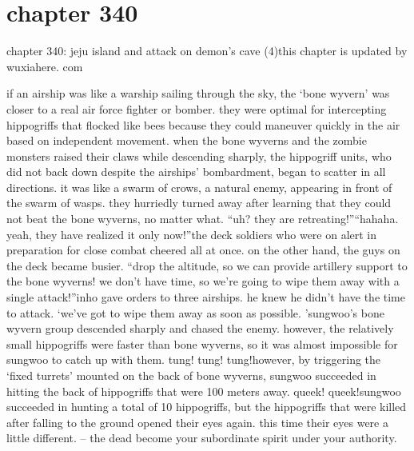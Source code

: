 \section{chapter 340}

chapter 340: jeju island and attack on demon’s cave (4)this chapter is updated by wuxiahere.
com




if an airship was like a warship sailing through the sky, the ‘bone wyvern’ was closer to a real air force fighter or bomber.
 they were optimal for intercepting hippogriffs that flocked like bees because they could maneuver quickly in the air based on independent movement.
when the bone wyverns and the zombie monsters raised their claws while descending sharply, the hippogriff units, who did not back down despite the airships’ bombardment, began to scatter in all directions.
 it was like a swarm of crows, a natural enemy, appearing in front of the swarm of wasps.
 they hurriedly turned away after learning that they could not beat the bone wyverns, no matter what.
“uh? they are retreating!”“hahaha.
 yeah, they have realized it only now!”the deck soldiers who were on alert in preparation for close combat cheered all at once.
on the other hand, the guys on the deck became busier.
“drop the altitude, so we can provide artillery support to the bone wyverns! we don’t have time, so we’re going to wipe them away with a single attack!”inho gave orders to three airships.
 he knew he didn’t have the time to attack.
‘we’ve got to wipe them away as soon as possible.
’sungwoo’s bone wyvern group descended sharply and chased the enemy.
however, the relatively small hippogriffs were faster than bone wyverns, so it was almost impossible for sungwoo to catch up with them.
tung! tung! tung!however, by triggering the ‘fixed turrets’ mounted on the back of bone wyverns, sungwoo succeeded in hitting the back of hippogriffs that were 100 meters away.
queek! queek!sungwoo succeeded in hunting a total of 10 hippogriffs, but the hippogriffs that were killed after falling to the ground opened their eyes again.
 this time their eyes were a little different.
– the dead become your subordinate spirit under your authority.

